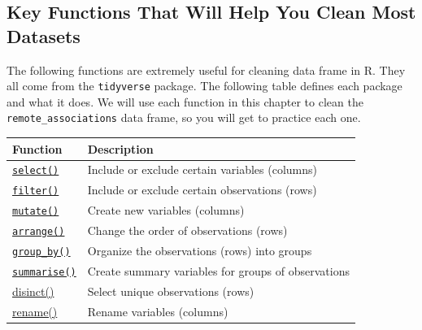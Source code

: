 \documentclass[
]{book}
\begin{document}
\subsection{Key Functions That Will Help You Clean Most Datasets}\label{key-functions-that-will-help-you-clean-most-datasets}

The following functions are extremely useful for cleaning data frame in R. They all come from the \texttt{tidyverse} package. The following table defines each package and what it does. We will use each function in this chapter to clean the \texttt{remote\_associations} data frame, so you will get to practice each one.

\begin{longtable}[]{@{}
  >{\centering\arraybackslash}p{}
  >{\raggedright\arraybackslash}p{}@{}}
\toprule\noalign{}
\begin{minipage}[b]{\linewidth}\centering
Function
\end{minipage} & \begin{minipage}[b]{\linewidth}\raggedright
Description
\end{minipage} \\
\midrule\noalign{}
\endhead
\bottomrule\noalign{}
\endlastfoot
\href{https://dplyr.tidyverse.org/reference/select.html}{\texttt{select()}} & Include or exclude certain variables (columns) \\
\href{https://dplyr.tidyverse.org/reference/filter.html}{\texttt{filter()}} & Include or exclude certain observations (rows) \\
\href{https://dplyr.tidyverse.org/reference/mutate.html}{\texttt{mutate()}} & Create new variables (columns) \\
\href{https://dplyr.tidyverse.org/reference/arrange.html}{\texttt{arrange()}} & Change the order of observations (rows) \\
\href{https://dplyr.tidyverse.org/reference/group_by.html}{\texttt{group\_by()}} & Organize the observations (rows) into groups \\
\href{https://dplyr.tidyverse.org/reference/summarise.html}{\texttt{summarise()}} & Create summary variables for groups of observations \\
\href{https://dplyr.tidyverse.org/articles/base.html?q=distinct\#distinct-select-distinctunique-rows}{disinct()} & Select unique observations (rows) \\
\href{https://dplyr.tidyverse.org/articles/base.html?q=rename\#rename-rename-variables-by-name}{rename()} & Rename variables (columns) \\
\end{longtable}
\end{document}
